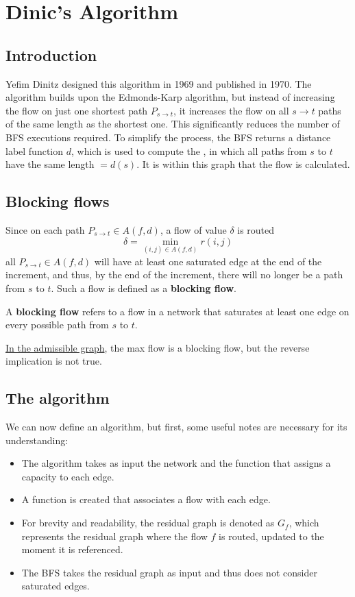 
\chapter{Dinic's Algorithm} \label{chap:dnc}
\section{Introduction}
Yefim Dinitz designed this algorithm in 1969 and published\cite{Dinitz2006} in 1970. 
The algorithm builds upon the Edmonds-Karp algorithm, but instead of increasing the flow on just one shortest path $P_{s\rightarrow t}$, it increases the flow on all $s\rightarrow t$ paths of the same length as the shortest one.
This significantly reduces the number of BFS executions required.
To simplify the process, the BFS returns a distance label function $d$, which is used to compute the , in which all paths from $s$ to $t$ have the same length $=d(s)$. It is within this graph that the flow is calculated.
\section{Blocking flows}
Since on each path $P_{s\rightarrow t} \in A(f,d)$, a flow of value $\delta$ is routed
\[\delta = \min_{(i,j)\in A(f,d)} r(i,j)\]
all $P_{s\rightarrow t} \in A(f,d)$ will have at least one saturated edge at the end of the increment, and thus, by the end of the increment, there will no longer be a path from $s$ to $t$.
Such a flow is defined as a \textbf{blocking flow}.
\begin{definition}
    A \textbf{blocking flow} refers to a flow in a network that saturates at least one edge on every possible path from $s$ to $t$.  
\end{definition}

\begin{obs}
    \underline{In the admissible graph}, the max flow is a blocking flow, but the reverse implication is not true.
\end{obs}
\section{The algorithm}
We can now define an algorithm, but first, some useful notes are necessary for its understanding:
\begin{itemize}
    \item The algorithm takes as input the network and the function that assigns a capacity to each edge.
    \item A function is created that associates a flow with each edge.
    \item For brevity and readability, the residual graph is denoted as \( G_f \), which represents the residual graph where the flow \( f \) is routed, updated to the moment it is referenced.
    \item The BFS takes the residual graph as input and thus does not consider saturated edges.
\end{itemize}


